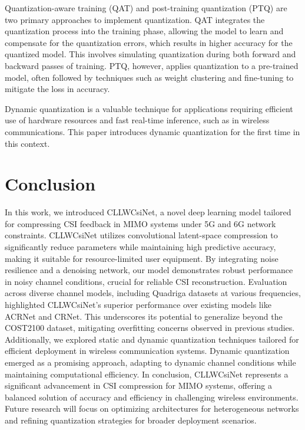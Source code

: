 \documentclass[lettersize,journal]{IEEEtran}
\begin{document}
Quantization-aware training (QAT) and post-training quantization (PTQ) are two primary approaches to implement quantization. QAT integrates the quantization process into the training phase, allowing the model to learn and compensate for the quantization errors, which results in higher accuracy for the quantized model. This involves simulating quantization during both forward and backward passes of training. PTQ, however, applies quantization to a pre-trained model, often followed by techniques such as weight clustering and fine-tuning to mitigate the loss in accuracy.

Dynamic quantization is a valuable technique for applications requiring efficient use of hardware resources and fast real-time inference, such as in wireless communications. This paper introduces dynamic quantization for the first time in this context.

\section{Conclusion}
In this work, we introduced CLLWCsiNet, a novel deep learning model tailored for compressing CSI feedback in MIMO systems under 5G and 6G network constraints. CLLWCsiNet utilizes convolutional latent-space compression to significantly reduce parameters while maintaining high predictive accuracy, making it suitable for resource-limited user equipment. By integrating noise resilience and a denoising network, our model demonstrates robust performance in noisy channel conditions, crucial for reliable CSI reconstruction.
Evaluation across diverse channel models, including Quadriga datasets at various frequencies, highlighted CLLWCsiNet's superior performance over existing models like ACRNet and CRNet. This underscores its potential to generalize beyond the COST2100 dataset, mitigating overfitting concerns observed in previous studies. Additionally, we explored static and dynamic quantization techniques tailored for efficient deployment in wireless communication systems. Dynamic quantization emerged as a promising approach, adapting to dynamic channel conditions while maintaining computational efficiency. In conclusion, CLLWCsiNet represents a significant advancement in CSI compression for MIMO systems, offering a balanced solution of accuracy and efficiency in challenging wireless environments. Future research will focus on optimizing architectures for heterogeneous networks and refining quantization strategies for broader deployment scenarios.
\end{document}

